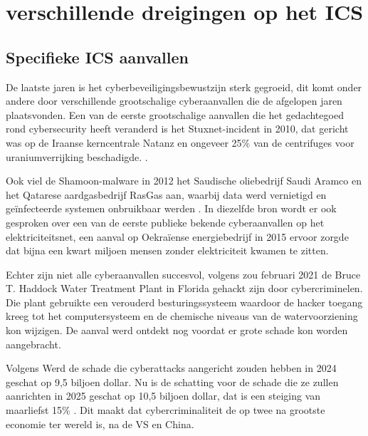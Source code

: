 \section{verschillende dreigingen op het ICS}

\subsection{Specifieke ICS aanvallen}

De laatste jaren is het cyberbeveiligingsbewustzijn sterk gegroeid, dit komt onder andere door verschillende grootschalige cyberaanvallen die de afgelopen jaren plaatsvonden. Een van de eerste grootschalige aanvallen die het gedachtegoed rond cybersecurity heeft veranderd is het Stuxnet-incident in 2010, dat gericht was op de Iraanse kerncentrale Natanz en ongeveer 25\% van de centrifuges voor uraniumverrijking beschadigde. \autocite{Zetter2014}. 

Ook viel de Shamoon-malware in 2012 het Saudische oliebedrijf Saudi Aramco en het Qatarese aardgasbedrijf RasGas aan, waarbij data werd vernietigd en geïnfecteerde systemen onbruikbaar werden \autocite{Hemsley2018}.
In diezelfde bron wordt er ook gesproken over een van de eerste publieke bekende cyberaanvallen op het elektriciteitsnet, een aanval op Oekraïense energiebedrijf in 2015 ervoor zorgde dat bijna een kwart miljoen mensen zonder elektriciteit kwamen te zitten.

Echter zijn niet alle cyberaanvallen succesvol, volgens \textcite{Margolin2021} zou februari 2021 de Bruce T. Haddock Water Treatment Plant in Florida gehackt zijn door cybercriminelen. Die plant gebruikte een verouderd besturingssysteem waardoor de hacker toegang kreeg tot het computersysteem en de chemische niveaus van de watervoorziening kon wijzigen. De aanval werd ontdekt nog voordat er grote schade kon worden aangebracht.



Volgens \textcite{Morgan2024} Werd de schade die cyberattacks aangericht zouden hebben in 2024 geschat op 9,5 biljoen dollar. Nu is de schatting voor de schade die ze zullen aanrichten in 2025 geschat op 10,5 biljoen dollar, dat is een steiging van maarliefst 15\% . Dit maakt dat cybercriminaliteit de op twee na grootste economie ter wereld is, na de VS en China.

